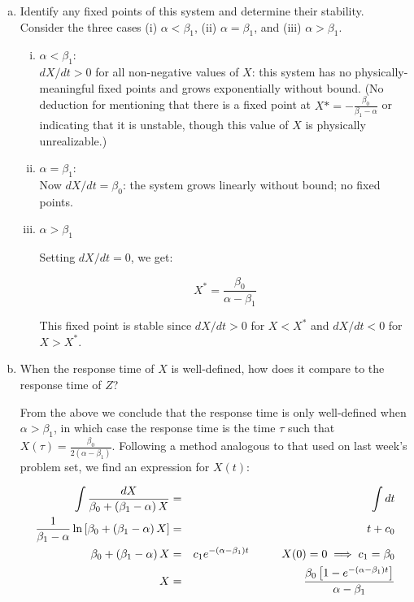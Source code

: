 \documentclass{article}
\begin{document}
\begin{enumerate}[a)]
\setlength{\itemsep}{0pt}
\item Identify any fixed points of this system and determine their stability. Consider the three cases (i) $\alpha < \beta_1$, (ii) $\alpha = \beta_1$, and (iii) $\alpha > \beta_1$.\\

{\color{red}
\begin{enumerate}[i)]
\item $\alpha < \beta_1$:\\

$dX/dt > 0$ for all non-negative values of $X$: this system has no physically-meaningful fixed points and grows exponentially without bound. (No deduction for mentioning that there is a fixed point at $X* = - \frac{\beta_0}{\beta_1 - \alpha} $ or indicating that it is unstable, though this value of $X$ is physically unrealizable.)

\item $\alpha = \beta_1$:\\

Now $dX/dt = \beta_0$: the system grows linearly without bound; no fixed points.

\item $\alpha > \beta_1$

Setting $dX/dt = 0$, we get:

\[ X^* = \frac{\beta_0}{\alpha - \beta_1} \]

This fixed point is stable since $dX/dt > 0$ for $X< X^*$ and $dX/dt < 0$ for $X > X^*$.


\end{enumerate}


}
\item When the response time of $X$ is well-defined, how does it compare to the response time of $Z$?\\

{
\color{red}
From the above we conclude that the response time is only well-defined when $\alpha > \beta_1$, in which case the response time is the time $\tau$ such that $X(\tau)=  \frac{ \beta_0}{2(\alpha - \beta_1)}$. Following a method analogous to that used on last week's problem set, we find an expression for $X(t)$:

\begin{eqnarray*}
\int \frac{dX}{\beta_0 + \left(\beta_1 - \alpha \right) X} & = & \int dt\\
\frac{1}{\beta_1 - \alpha} \ln \left[ \beta_0 + \left( \beta_1 - \alpha \right) X \right] & = & t + c_0\\
 \beta_0 + \left( \beta_1 - \alpha \right) X & = & c_1e^{-\left(\alpha - \beta_1 \right)t} \hspace{1 cm} X(0)=0 \implies c_1 = \beta_0\\
 X & = & \frac{\beta_0 \left[ 1 - e^{-\left(\alpha - \beta_1 \right)t}  \right]}{\alpha - \beta_1}
\end{eqnarray*}

}
\end{enumerate}
\end{document}
